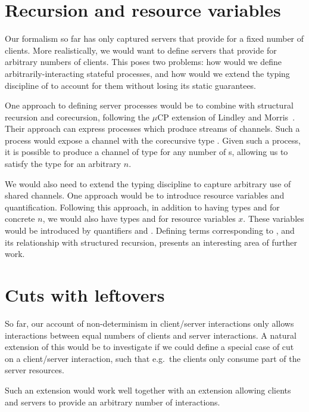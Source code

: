 \section{Recursion and resource variables}
Our formalism so far has only captured servers that provide for a fixed number
of clients.  More realistically, we would want to define servers that provide
for arbitrary numbers of clients.  This poses two problems: how would we define
arbitrarily-interacting stateful processes, and how would we extend the
typing discipline of \nodcap to account for them without losing its static
guarantees.

One approach to defining server processes would be to combine \nodcap with
structural recursion and corecursion, following the $\mu\text{CP}$ extension of Lindley
and Morris~\cite{lindley2016}.  Their approach can express processes which
produce streams of  channels. Such a process would expose a channel with the
corecursive type .  Given such a process, it is
possible to produce a channel of type  for any
number of s, allowing us to satisfy the type  for an arbitrary
$n$.

We would also need to extend the typing discipline to capture arbitrary use of
shared channels.  One approach would be to introduce resource variables and
quantification.  Following this approach, in addition to having types  and  for concrete $n$, we would also have types  and
 for resource variables $x$.  These variables would be introduced by
quantifiers  and .  Defining terms
corresponding to , and its relationship with structured recursion,
presents an interesting area of further work.

\section{Cuts with leftovers}
So far, our account of non-determinism in client/server interactions only allows
interactions between equal numbers of clients and server interactions.
A natural extension of this would be to investigate if we could define a special
case of cut on a client/server interaction, such that e.g.\ the clients only
consume part of the server resources.
\begin{scprooftree}
\end{scprooftree}
Such an extension would work well together with an extension allowing clients
and servers to provide an arbitrary number of interactions.

